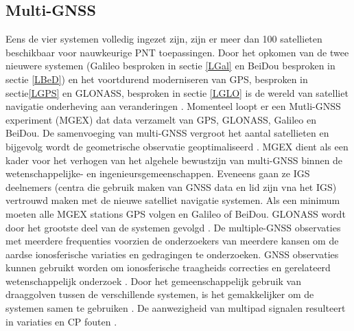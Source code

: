 \subsection{Multi-GNSS}
Eens de vier systemen volledig ingezet zijn, zijn er meer dan 100 satellieten beschikbaar voor nauwkeurige PNT toepassingen. Door het opkomen van de twee nieuwere systemen (Galileo besproken in sectie \ref{LGal} en BeiDou besproken in sectie \ref{LBeD}) en het voortdurend moderniseren van GPS, besproken in sectie\ref{LGPS} en GLONASS, besproken in sectie \ref{LGLO} is de wereld van satelliet navigatie onderheving aan veranderingen \cite{LBibGNSS4}. Momenteel loopt er een Mutli-GNSS experiment (MGEX) dat data verzamelt van GPS, GLONASS, Galileo en BeiDou. De samenvoeging van multi-GNSS vergroot het aantal satellieten en bijgevolg wordt de geometrische observatie geoptimaliseerd \cite{LBibGNSS5}. 
MGEX dient als een kader voor het verhogen van het algehele bewustzijn van multi-GNSS binnen de wetenschappelijke- en ingenieursgemeenschappen. Eveneens gaan ze IGS deelnemers (centra die gebruik maken van GNSS data en lid zijn vna het IGS) vertrouwd maken met de nieuwe satelliet navigatie systemen. Als een minimum moeten alle MGEX stations GPS volgen en Galileo of BeiDou. GLONASS wordt door het grootste deel van de systemen gevolgd \cite{LBibGNSS9}.  De multiple-GNSS observaties met meerdere frequenties voorzien de onderzoekers van meerdere kansen om de aardse ionosferische variaties en gedragingen te onderzoeken. GNSS observaties kunnen gebruikt worden om ionosferische traagheids correcties en gerelateerd wetenschappelijk onderzoek \cite{LBibBeiDou}. Door het gemeenschappelijk gebruik van draaggolven tussen de verschillende systemen, is het gemakkelijker om de systemen samen te gebruiken \cite{LBibPPP2}. De aanwezigheid van multipad signalen resulteert in variaties en CP fouten \cite{LBibGalileo3}. 

